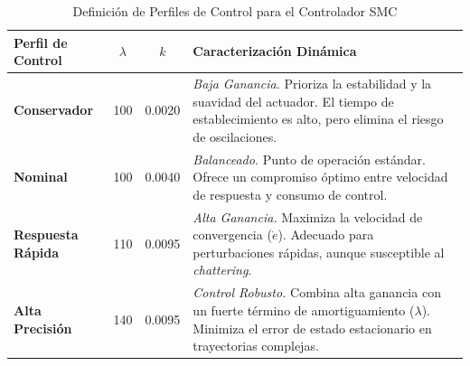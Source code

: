\documentclass[
A4paper,            1 paper size A4
oneside,            %
openright,          %
10pt,               %
headings=normal,    %
titlepage=on        %
]{article}
\begin{document}
\begin{table}[h]
    \centering
    \caption{Definición de Perfiles de Control para el Controlador SMC}
    \label{tab:perfiles_control_smc}
    \renewcommand{\arraystretch}{1.4} %
    \begin{tabular}{@{}l c c p{6.5cm}@{}}
    \toprule
    \textbf{Perfil de Control} & \textbf{$\lambda$} & \textbf{$k$} & \textbf{Caracterización Dinámica} \\ \midrule
    
    \textbf{Conservador} & 100 & 0.0020 & 
    \textit{Baja Ganancia.} Prioriza la estabilidad y la suavidad del actuador. El tiempo de establecimiento es alto, pero elimina el riesgo de oscilaciones. \\ 
    
    \textbf{Nominal} & 100 & 0.0040 & 
    \textit{Balanceado.} Punto de operación estándar. Ofrece un compromiso óptimo entre velocidad de respuesta y consumo de control. \\ 
    
    \textbf{Respuesta Rápida} & 110 & 0.0095 & 
    \textit{Alta Ganancia.} Maximiza la velocidad de convergencia ($\dot{e}$). Adecuado para perturbaciones rápidas, aunque susceptible al \textit{chattering}. \\ 
    
    \textbf{Alta Precisión} & 140 & 0.0095 & 
    \textit{Control Robusto.} Combina alta ganancia con un fuerte término de amortiguamiento ($\lambda$). Minimiza el error de estado estacionario en trayectorias complejas. \\ \bottomrule
    \end{tabular}
\end{table}
\end{document}
